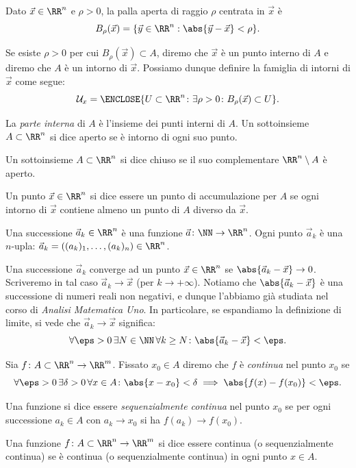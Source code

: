\begin{definition}[topologia]
Dato $\vec x \in \RR^n$ e $\rho>0$, la palla aperta di raggio $\rho$ centrata in $\vec x$ è
\[
B_\rho(\vec x) = \{\vec y \in \RR^n : \abs{\vec y - \vec x} < \rho\}.
\]

Se esiste $\rho>0$ per cui $B_\rho(\vec x) \subset A$, diremo che $\vec x$ è un punto interno di $A$
e diremo che $A$ è un intorno di $\vec x$.
Possiamo dunque definire la famiglia di intorni di $\vec x$ come segue:
\[
  \mathcal U_x = \ENCLOSE{U\subset \RR^n\colon \exists \rho>0\colon B_\rho(\vec x) \subset U}.
\]

La \emph{parte interna} di $A$ è l'insieme dei punti interni di $A$.
Un sottoinsieme $A\subset \RR^n$ si dice aperto se 
è intorno di ogni suo punto. 

Un sottoinsieme $A\subset \RR^n$ si dice chiuso se il suo complementare $\RR^n\setminus A$ è aperto.

Un punto $\vec x\in \RR^n$ si dice essere un punto di accumulazione per $A$ 
se ogni intorno di $\vec x$ contiene almeno un punto di $A$ diverso da $\vec x$.
\end{definition}

Una successione $\vec a_k\in \RR^n$ è una funzione $\vec a \colon \NN\to \RR^n$.
Ogni punto $\vec a_k$ è una $n$-upla: $\vec a_k = ((a_k)_1,\dots, (a_k)_n) \in \RR^n$.

Una successione $\vec a_k$ converge ad un punto $\vec x\in \RR^n$ 
se $\abs{\vec a_k - \vec x}\to 0$.
Scriveremo in tal caso $\vec a_k \to \vec x$ (per $k\to +\infty$).
Notiamo che $\abs{\vec a_k-\vec x}$ è una successione di numeri reali 
non negativi, e dunque l'abbiamo già studiata nel corso di \emph{Analisi Matematica Uno}.
In particolare, se espandiamo la definizione di limite, si vede 
che $\vec a_k \to \vec x$ significa:
\[
 \forall \eps>0\, \exists N\in \NN\, \forall k\ge N\colon \abs{\vec a_k- \vec x} < \eps.
\]

\begin{definition}[continuità]
Sia $f\colon A \subset \RR^n \to \RR^m$.
Fissato $x_0 \in A$ diremo che $f$ è \emph{continua} nel punto 
$x_0$
se 
\[
\forall \eps>0\, \exists \delta>0 \, \forall x\in A\colon
  \abs{x - x_0} < \delta \implies \abs{f(x) - f(x_0)} < \eps.
\] 

Una funzione si dice essere \emph{sequenzialmente continua} nel punto 
$x_0$ se per ogni successione $a_k\in A$ con $a_k\to x_0$
si ha $f(a_k)\to f(x_0)$.

Una funzione $f\colon A \subset \RR^n \to \RR^m$ si dice essere 
continua (o sequenzialmente continua) se è continua (o sequenzialmente 
continua) in ogni punto $x\in A$.
\end{definition}

